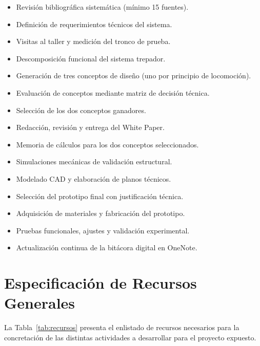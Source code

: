 \documentclass[lettersize,journal]{IEEEtran}
\begin{document}
\begin{itemize}
    \item Revisión bibliográfica sistemática (mínimo 15 fuentes).
    \item Definición de requerimientos técnicos del sistema.
    \item Visitas al taller y medición del tronco de prueba.
    \item Descomposición funcional del sistema trepador.
    \item Generación de tres conceptos de diseño (uno por principio de locomoción).
    \item Evaluación de conceptos mediante matriz de decisión técnica.
    \item Selección de los dos conceptos ganadores.
    \item Redacción, revisión y entrega del White Paper.
    \item Memoria de cálculos para los dos conceptos seleccionados.
    \item Simulaciones mecánicas de validación estructural.
    \item Modelado CAD y elaboración de planos técnicos.
    \item Selección del prototipo final con justificación técnica.
    \item Adquisición de materiales y fabricación del prototipo.
    \item Pruebas funcionales, ajustes y validación experimental.
    \item Actualización continua de la bitácora digital en OneNote.
\end{itemize}


\section{\textbf{Especificación de Recursos Generales}}

La Tabla~\ref{tab:recursos} presenta el enlistado de recursos necesarios para la
concretación de las distintas actividades a desarrollar para el proyecto expuesto.
\end{document}
